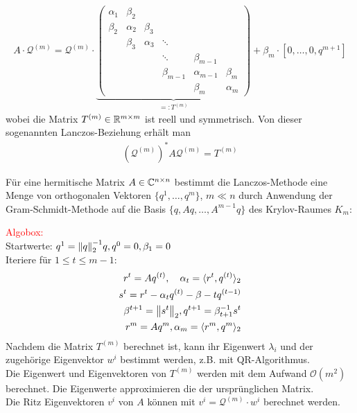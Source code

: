 \begin{align*}A\cdot \mathcal{Q}^{(m)} = \mathcal{Q}^{(m)}\cdot\underbrace{\begin{pmatrix}
  \alpha_1 & \beta_2 & & & & \\
  \beta_2 & \alpha_2 & \beta_3 & & & \\
  & \beta_3 & \alpha_3 & \ddots & & \\
  & & & \ddots & \beta_{m-1} & \\
  & & & \beta_{m-1} & \alpha_{m-1} & \beta_m \\
  & & & & \beta_m & \alpha_m
\end{pmatrix}}_{=:T^{(m)}} + \beta_m\cdot[0,\dots,0,q^{m+1}]\end{align*}
wobei die Matrix $T^{(m)}\in\mathbb R^{m\times m}$ ist reell und symmetrisch. Von dieser sogenannten Lanczos-Beziehung
erhält man 
\begin{align*}(\mathcal{Q}^{(m)})^* A \mathcal{Q}^{(m)} = T^{(m)}\end{align*} 
\begin{defbox}
  Für eine hermitische Matrix $A\in\mathbb C  ^{n\times n}$ bestimmt die Lanczos-Methode eine Menge von orthogonalen 
  Vektoren $\{q^1,\dots,q^m\}$, $m\ll n$ durch Anwendung der Gram-Schmidt-Methode auf die Basis 
  $\{q,Aq,\dots,A^{m-1}q\}$ des Krylov-Raumes $K_m$:
\end{defbox}
\textcolor{red}{Algobox:} \\
Startwerte: $q^1=\vertn{2}{q}_2^{-1}q, q^0=0, \beta_1=0$ \\
Iteriere für $1\leq t\leq m-1$:
\begin{align*}
  r^t = Aq^{(t)}, \quad \alpha_t = \langle r^t, q^{(t)}\rangle_2 \\
  s^t = r^t - \alpha_t q^{(t)} - \beta-tq^{(t-1)} \\
  \beta^{t+1} = \vertn{2}{s^t}_2, q^{t+1} = \beta_{t+1}^{-1}s^t \\
  r^m = Aq^m, \alpha_m = \langle r^m,q^m\rangle_2
\end{align*}
Nachdem die Matrix $T^{(m)}$ berechnet ist, kann ihr Eigenwert $\lambda_i$ und der zugehörige Eigenvektor $w^{i}$
bestimmt werden, z.B. mit QR-Algorithmus. \\
Die Eigenwert und Eigenvektoren von $T^{(m)}$ werden mit dem Aufwand $\mathcal{O}(m^2)$ berechnet. Die Eigenwerte 
approximieren die der ursprünglichen Matrix. \\
Die Ritz Eigenvektoren $v^i$ von $A$ können mit $v^i=\mathcal{Q}^{(m)}\cdot w^i$ berechnet werden.

